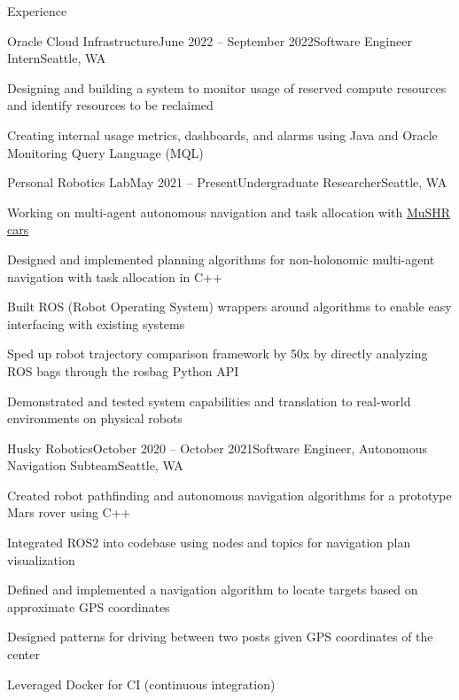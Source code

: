 \documentclass{resume} %
\begin{document}
\begin{rSection}{Experience}

\begin{rSubsection}{Oracle Cloud Infrastructure}{June 2022 – September 2022}{Software Engineer Intern}{Seattle, WA}
\item Designing and building a system to monitor usage of reserved compute resources and identify resources to be reclaimed
\item Creating internal usage metrics, dashboards, and alarms using Java and Oracle Monitoring Query Language (MQL)
\end{rSubsection}

\begin{rSubsection}{Personal Robotics Lab}{May 2021 – Present}{Undergraduate Researcher}{Seattle, WA}
\item Working on multi-agent autonomous navigation and task allocation with \href{https://mushr.io}{MuSHR cars}
\item Designed and implemented planning algorithms for non-holonomic multi-agent navigation with task allocation in C++
\item Built ROS (Robot Operating System) wrappers around algorithms to enable easy interfacing with existing systems
\item Sped up robot trajectory comparison framework by 50x by directly analyzing ROS bags through the rosbag Python API
\item Demonstrated and tested system capabilities and translation to real-world environments on physical robots
\end{rSubsection}

\begin{rSubsection}{Husky Robotics}{October 2020 – October 2021}{Software Engineer, Autonomous Navigation Subteam}{Seattle, WA}
\item Created robot pathfinding and autonomous navigation algorithms for a prototype Mars rover using C++
\item Integrated ROS2 into codebase using nodes and topics for navigation plan visualization
\item Defined and implemented a navigation algorithm to locate targets based on approximate GPS coordinates
\item Designed patterns for driving between two posts given GPS coordinates of the center
\item Leveraged Docker for CI (continuous integration)
\end{rSubsection}

\end{rSection}
\end{document}
